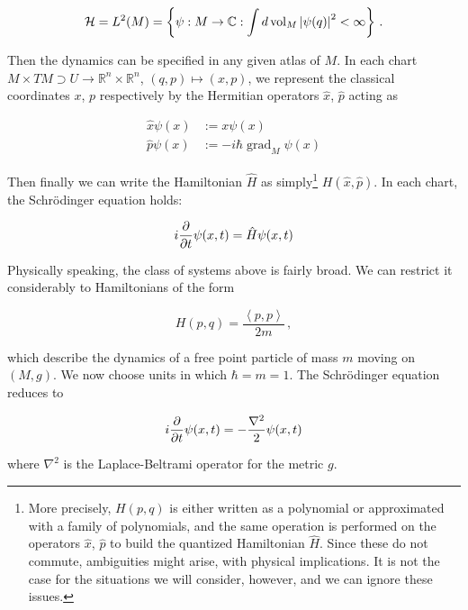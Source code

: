 \documentclass{article}
\newcommand{\hil}{\ensuremath{\mathcal{H}}}
\begin{document}
\begin{equation}
    \hil = L^2(M) = \left\{ \psi : M \rightarrow \mathbb{C} : \int d\operatorname{vol}_M \abs{\psi(q)}^2 < \infty \right\}\,.
\end{equation}

Then the dynamics can be specified in any given atlas of $M$. In each chart $M \times TM \supset U \rightarrow \mathbb{R}^n \times \mathbb{R}^n$, $(q,p) \mapsto (x,p)$, we represent the classical coordinates $x$, $p$ respectively by the Hermitian operators $\hat x$, $\hat p$ acting as

\begin{align}
    \hat x \psi(x) & := x \psi(x)\\
    \hat p \psi(x) & := -i \hbar \operatorname{grad}_M \psi(x)
\end{align}

Then finally we can write the Hamiltonian $\hat H$ as simply\footnote{More precisely, $H(p,q)$ is either written as a polynomial or approximated with a family of polynomials, and the same operation is performed on the operators $\hat x$, $\hat p$ to build the quantized Hamiltonian $\hat H$. Since these do not commute, ambiguities might arise, with physical implications. It is not the case for the situations we will consider, however, and we can ignore these issues.} $H(\hat x, \hat p)$. In each chart, the Schr\"odinger equation holds:

\begin{equation}
    i \pdv{t} \psi(x,t) = \hat H \psi(x,t)
\end{equation}

Physically speaking, the class of systems above is fairly broad. We can restrict it considerably to Hamiltonians of the form

\begin{equation}
    H(p,q) = \frac{\left\langle p, p \right\rangle}{2m}\,,
\end{equation}

which describe the dynamics of a free point particle of mass $m$ moving on $(M,g)$. We now choose units in which $\hbar = m = 1$. The Schr\"odinger equation reduces to

\begin{equation} \label{localschroedinger}
    i \pdv{t} \psi(x,t) = - \frac{\nabla^2}{2} \psi(x,t)
\end{equation}

where $\nabla^2$ is the Laplace-Beltrami operator for the metric $g$.
\end{document}

